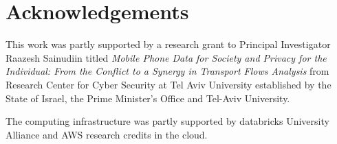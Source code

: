 \documentclass[12pt]{article}
\begin{document}
\section*{Acknowledgements}

This work was partly supported by a research grant to Principal Investigator Raazesh Sainudiin titled 
{\em Mobile Phone Data for Society and Privacy for the Individual: From the Conflict to a Synergy in Transport Flows Analysis} 
from Research Center for Cyber Security at Tel Aviv University established by the State of Israel, 
the Prime Minister’s Office and Tel-Aviv University. 

The computing infrastructure was partly supported by databricks University Alliance and AWS research credits in the cloud.
\end{document}
